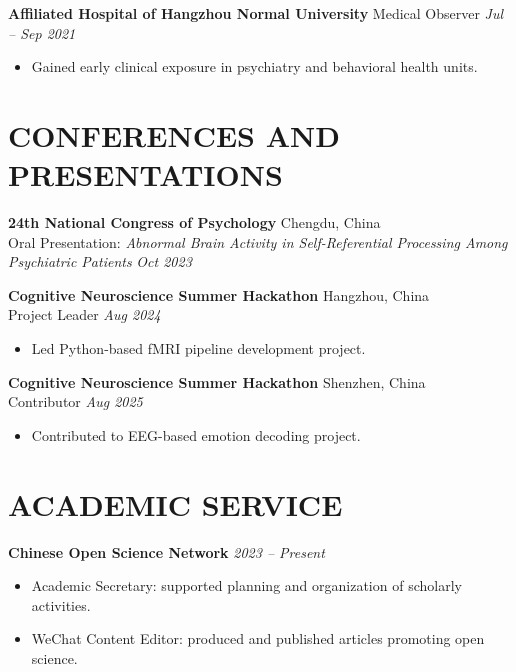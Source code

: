 \documentclass[10pt,a4paper]{article}
\begin{document}
\textbf{Affiliated Hospital of Hangzhou Normal University} \hfill Medical Observer \hfill \textit{Jul – Sep 2021}
\begin{itemize}
    \item Gained early clinical exposure in psychiatry and behavioral health units.
\end{itemize}

\vspace{1 em} 

\section*{CONFERENCES AND PRESENTATIONS}
\textbf{24th National Congress of Psychology} \hfill Chengdu, China \\
Oral Presentation: \textit{Abnormal Brain Activity in Self-Referential Processing Among Psychiatric Patients} \hfill \textit{Oct 2023}

\textbf{Cognitive Neuroscience Summer Hackathon} \hfill Hangzhou, China \\
Project Leader \hfill \textit{Aug 2024} 
\begin{itemize}
    \item Led Python-based fMRI pipeline development project.
\end{itemize}

\textbf{Cognitive Neuroscience Summer Hackathon} \hfill Shenzhen, China \\
Contributor \hfill \textit{Aug 2025}
\begin{itemize}
    \item Contributed to EEG-based emotion decoding project.
\end{itemize}

\vspace{1 em} 

\section*{ACADEMIC SERVICE}
\textbf{Chinese Open Science Network} \hfill \textit{2023 – Present} 
\begin{itemize}
    \item Academic Secretary: supported planning and organization of scholarly activities.
    \item WeChat Content Editor: produced and published articles promoting open science.
\end{itemize}

\vspace{1 em} 
\end{document}

